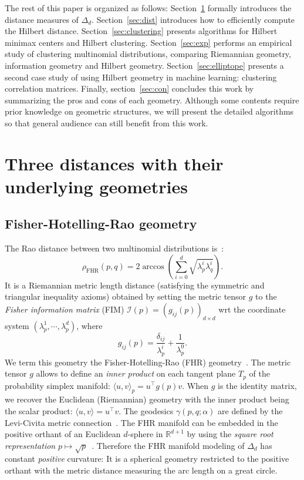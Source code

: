 \documentclass[graybox]{svmult}
\def\bbR{\mathbb{R}}
\def\Finner#1#2#3{{\langle {#1},{#2} \rangle}_{#3}}
\def\inner#1#2{ \langle {#1},{#2} \rangle }
\def\FHR{\mathrm{FHR}}
\begin{document}

The rest of this paper is organized as follows:
Section~\ref{sec:distances} formally introduces the distance measures of $\Delta_d$.
Section~\ref{sec:dist} introduces how to efficiently compute the Hilbert distance.
Section~\ref{sec:clustering} presents algorithms for Hilbert minimax centers and Hilbert clustering.
Section~\ref{sec:exp} performs an empirical study of clustering multinomial distributions,
comparing Riemannian geometry, information geometry and Hilbert geometry.
Section~\ref{sec:elliptope} presents a second case study of using Hilbert geometry in machine learning: clustering correlation matrices.
Finally, section~\ref{sec:con} concludes this work by summarizing the pros and cons of each geometry.
Although some contents require prior knowledge on geometric structures, 
we will present the detailed algorithms so that general audience can still benefit from this work.

\section{Three distances with their underlying geometries}\label{sec:distances}

\subsection{Fisher-Hotelling-Rao geometry}

The Rao distance between two multinomial distributions is~\cite{KassVos-1997,MetricLearning-2002}:
\begin{equation}
\rho_{\FHR}(p,q) = 2\arccos\left(\sum_{i=0}^{d} \sqrt{\lambda_p^i\lambda_q^i}\right).
\end{equation}
It is a Riemannian metric length distance (satisfying the symmetric and triangular inequality axioms)
obtained by setting the metric tensor $g$ to the {\em Fisher information matrix} (FIM)
$\mathcal{I}(p)=(g_{ij}(p))_{d\times{d}}$ wrt the coordinate system $(\lambda_p^1,\cdots,\lambda_p^d)$,
where
$$
g_{ij}(p) = \frac{\delta_{ij}}{\lambda_p^i} + \frac{1}{\lambda_p^0}.
$$
We term this geometry the Fisher-Hotelling-Rao (FHR) geometry~\cite{Hotelling-1930,storyLM-2007,Rao-1945,Rao-reprint-1992}.
The metric tensor $g$ allows to define an {\em inner product} on each tangent plane $T_p$ of the probability simplex manifold: $\Finner{u}{v}{p}=u^\top g(p) v$.
When $g$ is the identity matrix, we recover the Euclidean (Riemannian) geometry with the inner product being the scalar product: $\inner{u}{v}=u^\top v$.
The geodesics $\gamma(p,q;\alpha)$ are defined by the Levi-Civita metric connection~\cite{IG-2016,IG-2014}.
The FHR manifold can be embedded in the positive orthant of an Euclidean $d$-sphere in $\bbR^{d+1}$
by using the {\em square root representation} $p\mapsto \sqrt{p}$~\cite{KassVos-1997}.
Therefore the FHR manifold modeling of $\Delta_d$ has constant {\em positive} curvature: It is a spherical geometry restricted to the positive orthant with the metric distance measuring the arc length on a great circle.
\end{document}
